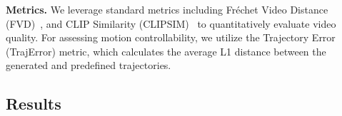 \noindent \textbf{Metrics.} We leverage standard metrics including Fréchet Video Distance (FVD)~\cite{Thomas2018fvd}, and CLIP Similarity (CLIPSIM)~\cite{wu2021godiva} to quantitatively evaluate video quality. 
For assessing motion controllability, we utilize the Trajectory Error (TrajError) metric, which calculates the average L1 distance between the generated and predefined trajectories. 





\subsection{Results}

